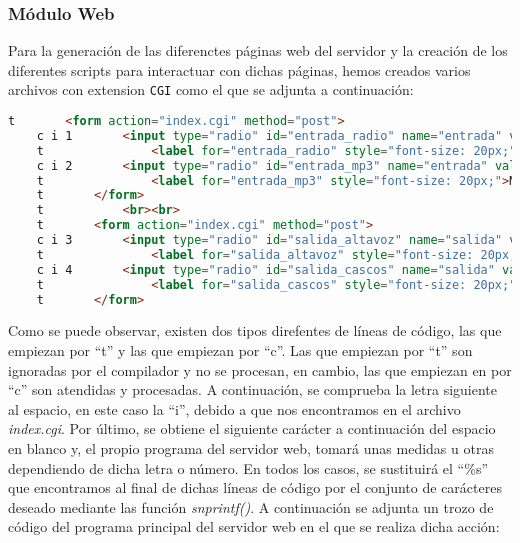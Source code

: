 \subsubsection{Módulo Web}
\label{subsec:modulo-web}
Para la generación de las diferenctes páginas web del servidor y la creación de los diferentes scripts para interactuar con dichas páginas, hemos creados varios archivos con extension \texttt{CGI} como el que se adjunta a continuación:

\begin{lstlisting}[captionpos=b, caption={Ejemplo archivo .CGI}, language=html]
    t       <form action="index.cgi" method="post">
    c i 1       <input type="radio" id="entrada_radio" name="entrada" value="radio" OnClick="submit();" %s>
    t               <label for="entrada_radio" style="font-size: 20px;">Radio</label>
    c i 2       <input type="radio" id="entrada_mp3" name="entrada" value="mp3" OnClick="submit();" %s>
    t               <label for="entrada_mp3" style="font-size: 20px;">MP3</label>
    t       </form>
    t           <br><br>
    t       <form action="index.cgi" method="post">
    c i 3       <input type="radio" id="salida_altavoz" name="salida" value="altavoz" OnClick="submit();" %s>
    t               <label for="salida_altavoz" style="font-size: 20px;">Altavoz</label>
    c i 4       <input type="radio" id="salida_cascos" name="salida" value="cascos" OnClick="submit();" %s>
    t               <label for="salida_cascos" style="font-size: 20px;">Cascos</label>
    t       </form>
    \end{lstlisting}

Como se puede observar, existen dos tipos direfentes de líneas de código, las que empiezan por ``t'' y las que empiezan por ``c''. Las que empiezan por ``t'' son ignoradas por el compilador y no se procesan, en cambio, las que empiezan en  por ``c'' son atendidas y procesadas. A continuación, se comprueba la letra siguiente al espacio, en este caso la ``i'', debido a que nos encontramos en el archivo \textit{index.cgi}. Por último, se obtiene el siguiente carácter a continuación del espacio en blanco y, el propio programa del servidor web, tomará unas medidas u otras dependiendo de dicha letra o número. En todos los casos, se sustituirá el ``\%s'' que encontramos al final de dichas líneas de código por el conjunto de carácteres deseado mediante las función \textit{snprintf()}. A continuación se adjunta un trozo de código del programa principal del servidor web en el que se realiza dicha acción:

